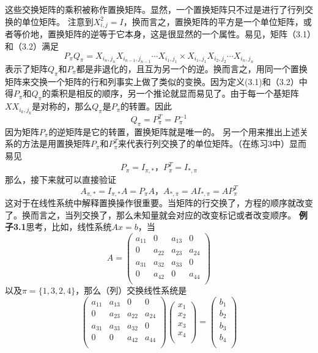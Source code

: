 \documentclass{article}
\begin{document}
这些交换矩阵的乘积被称作置换矩阵。显然，一个置换矩阵只不过是进行了行列交换的单位矩阵。
\newline
注意到$X_{i,j}^2=I$，换而言之，置换矩阵的平方是一个单位矩阵，或者等价地，置换矩阵的逆等于它本身，这是很显然的一个属性。易见，矩阵（3.1）和（3.2）满足
$$P_{\pi}Q_{\pi}=X_{i_n,j_n}X_{i_{n-1},j_{n-1}}\cdots X_{i_1,j_1}\times X_{i_1,j_1}X_{i_2,j_2}\cdots X_{i_n,j_n}$$表示了矩阵$Q_{\pi}$和$P_{\pi}$都是非退化的，且互为另一个的逆。换而言之，用同一个置换矩阵来交换一个矩阵的行和列事实上做了类似的变换。因为定义(3.1)和（3.2）中得$P_{\pi}$和$Q_{\pi}$的乘积是相反的顺序，另一个推论就显而易见了。由于每一个基矩阵$XX_{i_k,j_k}$是对称的，那么$Q_{\pi}$是$P_{\pi}$的转置。因此$$Q_{\pi}=P_{\pi}^T=P_{\pi}^{-1}$$
因为矩阵$P_{\pi}$的逆矩阵是它的转置，置换矩阵就是唯一的。
\newline
另一个用来推出上述关系的方法是用置换矩阵$P_{\pi}$和$P_{\pi}^T$来代表行列交换了的单位矩阵。（在练习3中）显而易见$$P_{\pi}=I_{\pi,*}，P_{\pi}^T=I_{*,\pi}$$
那么，接下来就可以直接验证$$A_{\pi,*}=I_{\pi,*}A=P_{\pi}A，A_{*,\pi}=AI_{*,\pi}=AP_{\pi}^T$$
这对于在线性系统中解释置换操作很重要。当矩阵的行交换了，方程的顺序就改变了。换而言之，当列交换了，那么未知量就会对应的改变标记或者改变顺序。
\newline
\textbf{例子3.1}思考，比如，线性系统$Ax=b$，当
$$
A=
\left (                 
\begin{array}{cccc}   
    a_{11} & 0 & a_{13} & 0\\  
    0 & a_{22} & a_{23} & a_{24} \\ 
    a_{31} & a_{32} & a_{33} & 0 \\ 
    0 & a_{42} & 0 & a_{44} \\ 
\end{array}
\right)                
$$
以及$\pi = \{1,3,2,4\}$，那么（列）交换线性系统是
$$
\left (                 
\begin{array}{cccc}   
    a_{11} & a_{13}& 0 & 0\\  
    0 & a_{23}& a_{22}  & a_{24} \\ 
    a_{31} & a_{33}& a_{32}  & 0 \\ 
    0  & 0& a_{42} & a_{44} \\ 
\end{array}
\right)          
\left (                 
\begin{array}{c}   
    x_{1} \\  
    x_{2} \\  
    x_{3} \\  
    x_{4} \\  
\end{array}
\right)           
=
\left (                 
\begin{array}{c}   
    b_{1} \\  
    b_{2} \\  
    b_{3} \\  
    b_{4} \\  
\end{array}
\right)   
$$
\end{document}
